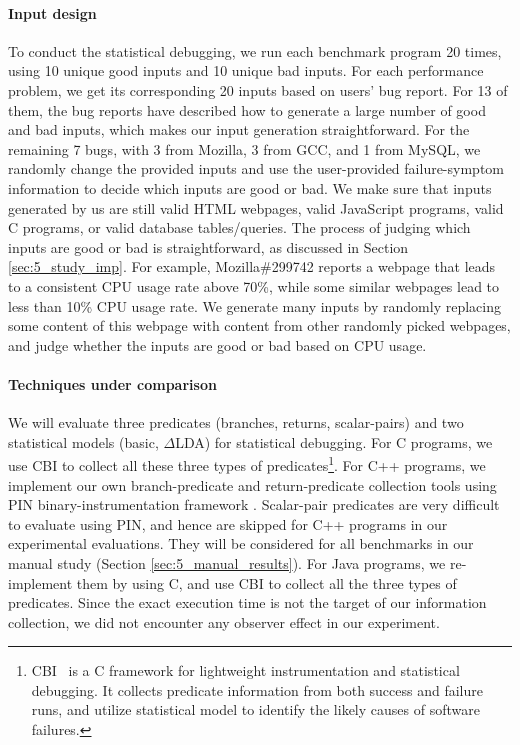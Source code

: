 \paragraph{Input design}
To conduct the statistical debugging, we run each benchmark program 20 times, using
10 unique good inputs and 10 unique bad inputs.
For each performance problem, we get its corresponding 20 inputs based on users'
bug report. For 13 of them, the bug reports have described
how to generate a large number of good and bad inputs, which makes our input
generation straightforward. For the remaining 7 bugs, with 3 from Mozilla, 3 
from GCC, and 1 from MySQL, we randomly
change the provided inputs and use the user-provided failure-symptom
information to decide which inputs are good or bad.
We make sure that inputs generated by us are still valid HTML webpages, valid JavaScript programs,
valid C programs, or valid database tables/queries.
The process of judging which inputs
are good or bad is straightforward,
as discussed in Section \ref{sec:5_study_imp}.
For example, Mozilla\#299742 reports a webpage that leads to a consistent
CPU usage rate above 70\%, while some similar webpages lead to less than 10\% 
CPU usage rate. We generate many inputs by randomly replacing some content of this 
webpage with content from other randomly picked webpages, and judge whether
the inputs are good or bad based on CPU usage. 

\paragraph{Techniques under comparison}
We will evaluate three predicates (branches, returns, scalar-pairs)
and two statistical models (basic, $\Delta$LDA) for statistical debugging.
For C programs, we use CBI \citep{liblit03,liblit05} to collect all these
three types of predicates\footnote{
CBI~\citep{liblit03,liblit05} 
is a C framework for lightweight instrumentation and statistical debugging. 
It collects predicate information from both success and failure runs,
and utilize statistical 
model to identify the likely causes of software failures. 
}.
For C++ programs, we implement our own branch-predicate and
return-predicate collection tools using
PIN binary-instrumentation framework \citep{pin}.
Scalar-pair predicates are very difficult to evaluate using PIN, 
and hence are skipped for C++ programs in our experimental evaluations.
They will be considered for all benchmarks in our manual study 
(Section \ref{sec:5_manual_results}).
For Java programs, we re-implement them by using C, 
and use CBI to collect all the three types of predicates.
Since the exact execution time is not the target of our information collection,
we did not encounter any observer effect in our experiment.

